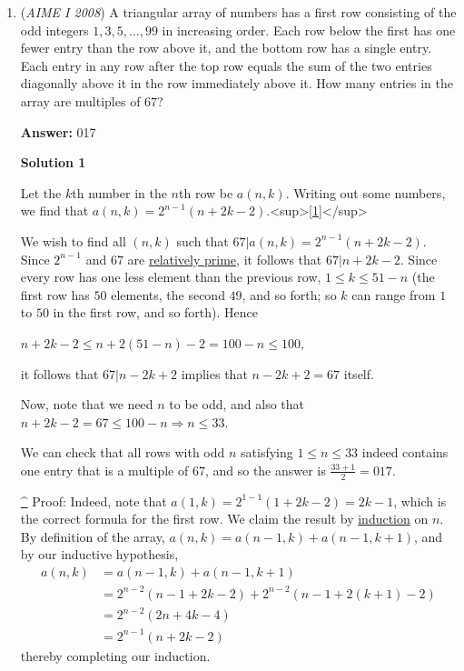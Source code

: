 \begin{enumerate}
 Also, the length of the path is 17 times the circumference of the base, which is $34r\pi$. Setting these equal gives $\sqrt {r^{2} + h^{2}} = 17r$, or $h^{2} = 288r^{2}$. Thus, $\dfrac{h^{2}}{r^{2}} = 288$, and $\dfrac{h}{r} = 12\sqrt {2}$, giving an answer of $12 + 2 = \boxed{014}$.

 


	\item (\textit{AIME I 2008}) A triangular array of numbers has a first row consisting of the odd integers $1,3,5,\ldots,99$ in increasing order.  Each row below the first has one fewer entry than the row above it, and the bottom row has a single entry.  Each entry in any row after the top row equals the sum of the two entries diagonally above it in the row immediately above it.  How many entries in the array are multiples of $67$?


 
 \textbf{Answer: }017



\textbf{Solution 1}

Let the $k$th number in the $n$th row be $a(n,k)$. Writing out some numbers, we find that $a(n,k) = 2^{n-1}(n+2k-2)$.<sup>[\href{https://artofproblemsolving.com\#note\_1}{1}]</sup>

 We wish to find all $(n,k)$ such that $67| a(n,k) = 2^{n-1} (n+2k-2)$. Since $2^{n-1}$ and $67$ are \href{https://artofproblemsolving.com/wiki/index.php?title=Relatively\_prime}{relatively prime}, it follows that $67|n+2k-2$. Since every row has one less element than the previous row, $1 \le k \le 51-n$ (the first row has $50$ elements, the second $49$, and so forth; so $k$ can range from $1$ to $50$ in the first row, and so forth). Hence 

 $n+2k-2 \le n + 2(51-n) - 2 = 100 - n \le 100,$

 it follows that $67| n - 2k + 2$ implies that $n-2k+2 = 67$ itself.

 Now, note that we need $n$ to be odd, and also that $n+2k-2 = 67 \le 100-n \Longrightarrow n \le 33$.

 We can check that all rows with odd $n$ satisfying $1 \le n \le 33$ indeed contains one entry that is a multiple of $67$, and so the answer is $\frac{33+1}{2} = \boxed{017}$.

 



 \href{https://artofproblemsolving.com\#ref\_1}{\textasciicircum{}} Proof: Indeed, note that $a(1,k) = 2^{1-1}(1+2k-2)=2k-1$, which is the correct formula for the first row. We claim the result by \href{https://artofproblemsolving.com/wiki/index.php?title=Induction}{induction} on $n$. By definition of the array, $a(n,k) = a(n-1,k)+a(n-1,k+1)$, and by our inductive hypothesis, 
 \begin{align*}a(n,k) &= a(n-1,k)+a(n-1,k+1)\\ &= 2^{n-2}(n-1+2k-2)+2^{n-2}(n-1+2(k+1)-2)\\&=2^{n-2}(2n+4k-4)\\&=2^{n-1}(n+2k-2)\end{align*}
thereby completing our induction.


\end{enumerate}
